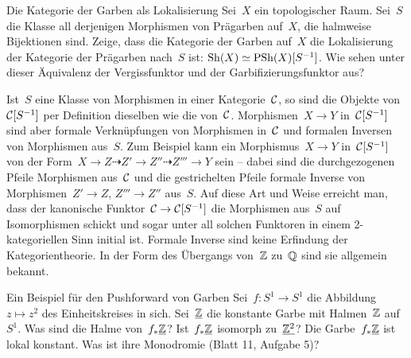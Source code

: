 \documentclass{uebblatt}
\begin{document}
\begin{aufgabe}{Die Kategorie der Garben als Lokalisierung}
Sei~$X$ ein topologischer Raum. Sei~$S$ die Klasse all
derjenigen Morphismen von Prägarben auf~$X$, die halmweise Bijektionen sind.
Zeige, dass die Kategorie der Garben auf~$X$ die Lokalisierung der Kategorie
der Prägarben nach~$S$ ist: $\mathrm{Sh}(X) \simeq \mathrm{PSh}(X)[S^{-1}]$. Wie sehen unter
dieser Äquivalenz der Vergissfunktor und der Garbifizierungsfunktor aus?

{\scriptsize Ist~$S$ eine Klasse von Morphismen in einer Kategorie~$\mathcal{C}$, so
sind die Objekte von~$\mathcal{C}[S^{-1}]$ per Definition dieselben wie die von~$\mathcal{C}$.
Morphismen~$X \to Y$ in~$\mathcal{C}[S^{-1}]$ sind aber formale Verknüpfungen von
Morphismen in~$\mathcal{C}$ und formalen Inversen von Morphismen aus~$S$. Zum Beispiel
kann ein Morphismus~$X \to Y$ in~$\mathcal{C}[S^{-1}]$ von der Form~$X \to Z
\dashrightarrow Z' \to Z'' \dashrightarrow Z''' \to Y$ sein -- dabei sind die
durchgezogenen Pfeile Morphismen aus~$\mathcal{C}$ und die gestrichelten Pfeile
formale Inverse von Morphismen~$Z' \to Z$, $Z''' \to Z''$ aus~$S$. Auf
diese Art und Weise erreicht man, dass der kanonische Funktor~$\mathcal{C} \to
\mathcal{C}[S^{-1}]$ die Morphismen aus~$S$ auf Isomorphismen schickt und sogar unter
all solchen Funktoren in einem 2-kategoriellen Sinn initial ist. Formale
Inverse sind keine Erfindung der Kategorientheorie. In der Form des Übergangs
von~$\mathbb{Z}$ zu~$\mathbb{Q}$ sind sie allgemein bekannt.
\par}
\end{aufgabe}

\begin{aufgabe}{Ein Beispiel für den Pushforward von Garben}
Sei~$f : S^1 \to S^1$ die Abbildung~$z \mapsto z^2$ des Einheitskreises in
sich. Sei~$\underline{\mathbb{Z}}$ die konstante Garbe mit Halmen~$\mathbb{Z}$ auf~$S^1$. Was sind
die Halme von~$f_*\underline{\mathbb{Z}}$? Ist~$f_*\underline{\mathbb{Z}}$ isomorph zu~$\underline{\mathbb{Z}^2}$?
Die Garbe~$f_*\underline{\mathbb{Z}}$ ist lokal konstant. Was ist ihre Monodromie (Blatt 11, Aufgabe 5)?
\end{aufgabe}
\end{document}

